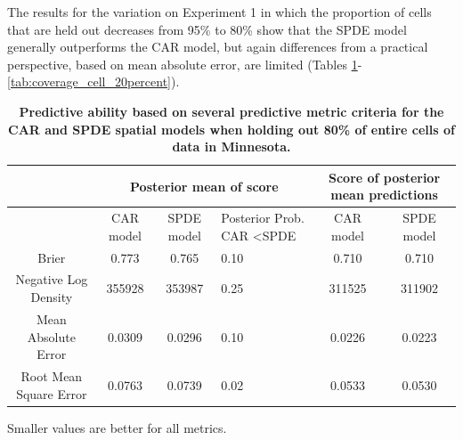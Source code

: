 \documentclass[10pt,letterpaper]{article}
\begin{document}
The results for the variation on Experiment 1 in which the proportion
of cells that are held out decreases from 95\% to 80\% show that the
SPDE model generally outperforms the CAR model, but again differences
from a practical perspective, based on mean absolute error, are limited
(Tables \ref{tab:score_cell_20percent}-\ref{tab:coverage_cell_20percent}). 



\begin{table}
\begin{adjustwidth}{-2.25in}{0in}
\caption{{\bf Predictive ability based on several predictive metric criteria for
the CAR and SPDE spatial models when holding out 80\% of entire cells
of data in Minnesota.}}


\begin{tabular}{|c|c|c|>{\centering}p{3cm}|c|c|}
\hline 
 &
\multicolumn{3}{c|}{{\small{}Posterior mean of score}} &
\multicolumn{2}{c|}{{\small{}Score of posterior mean predictions}}\tabularnewline
\hline 
\hline 
 &
{\small{}CAR model} &
{\small{}SPDE model} &
{\small{}Posterior Prob. CAR \textless  SPDE} &
{\small{}CAR model} &
{\small{}SPDE model}\tabularnewline
\hline 
{\small{}Brier} &
{\small{}0.773} &
{\small{}0.765} &
{\small{}0.10} &
{\small{}0.710} &
{\small{}0.710}\tabularnewline
\hline 
{\small{}Negative Log Density} &
{\small{}355928} &
{\small{}353987} &
{\small{}0.25} &
{\small{}311525} &
{\small{}311902}\tabularnewline
\hline 
{\small{}Mean Absolute Error} &
{\small{}0.0309} &
{\small{}0.0296} &
{\small{}0.10} &
{\small{}0.0226} &
{\small{}0.0223}\tabularnewline
\hline 
{\small{}Root Mean Square Error} &
{\small{}0.0763} &
{\small{}0.0739} &
{\small{}0.02} &
{\small{}0.0533} &
{\small{}0.0530}\tabularnewline
\hline 
\end{tabular}
\begin{flushleft}
 Smaller values are better for all metrics.
\end{flushleft}

\label{tab:score_cell_20percent}
\end{adjustwidth}
\end{table}
\end{document}
